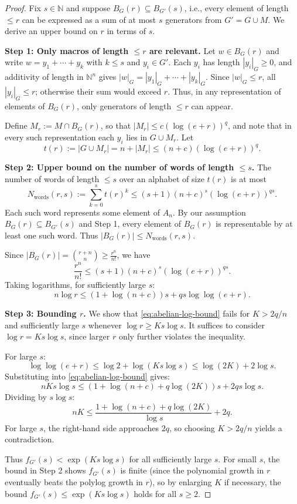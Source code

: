 \documentclass[12pt]{amsart}
\newcommand{\N}{\mathbb{N}}
\theoremstyle{definition}
\theoremstyle{remark}
\begin{document}
\begin{proof}
Fix $s \in \N$ and suppose $B_G(r) \subseteq B_{G'}(s)$, i.e., every element of length $\leq r$ can be expressed as a sum of at most $s$ generators from $G' = G \cup M$. We derive an upper bound on $r$ in terms of $s$.

\textbf{Step 1: Only macros of length $\leq r$ are relevant.}
Let $w \in B_G(r)$ and write $w = y_1 + \cdots + y_k$ with $k \leq s$ and $y_i \in G'$.
Each $y_i$ has length $|y_i|_G \geq 0$, and additivity of length in $\N^n$ gives $|w|_G = |y_1|_G + \cdots + |y_k|_G$.
Since $|w|_G \leq r$, all $|y_i|_G \leq r$; otherwise their sum would exceed $r$.
Thus, in any representation of elements of $B_G(r)$, only generators of length $\leq r$ can appear.

Define $M_r := M \cap B_G(r)$, so that $|M_r| \leq c(\log(e + r))^q$, and note that in every such representation each $y_i$ lies in $G \cup M_r$. Let
\[
t(r) := |G \cup M_r| = n + |M_r| \leq (n + c)(\log(e + r))^q.
\]

\textbf{Step 2: Upper bound on the number of words of length $\leq s$.}
The number of words of length $\leq s$ over an alphabet of size $t(r)$ is at most
\[
N_{\mathrm{words}}(r, s) := \sum_{k=0}^{s} t(r)^k \leq (s+1) (n+c)^s (\log(e + r))^{qs}.
\]
Each such word represents some element of $A_n$.
By our assumption $B_G(r) \subseteq B_{G'}(s)$ and Step 1, every element of $B_G(r)$ is representable by at least one such word.
Thus $|B_G(r)| \leq N_{\mathrm{words}}(r, s)$.

Since $|B_G(r)| = \binom{r+n}{n} \geq \frac{r^n}{n!}$, we have
\[
\frac{r^n}{n!} \leq (s+1) (n+c)^s (\log(e + r))^{qs}.
\]
Taking logarithms, for sufficiently large $s$:
\begin{equation}\label{eq:abelian-log-bound}
n \log r \leq (1 + \log(n+c)) s + qs \log\log(e + r).
\end{equation}

\textbf{Step 3: Bounding $r$.} We show that \eqref{eq:abelian-log-bound} fails for $K > 2q/n$ and sufficiently large $s$ whenever $\log r \geq Ks\log s$.
It suffices to consider $\log r = Ks\log s$, since larger $r$ only further violates the inequality.

For large $s$:
\[
\log\log(e + r) \leq \log 2 + \log(Ks \log s) \leq \log(2K) + 2 \log s.
\]
Substituting into \eqref{eq:abelian-log-bound} gives:
\[
nKs\log s \leq (1 + \log(n+c) + q\log(2K))s + 2qs\log s.
\]
Dividing by $s\log s$:
\[
nK \leq \frac{1 + \log(n+c) + q\log(2K)}{\log s} + 2q.
\]
For large $s$, the right-hand side approaches $2q$, so choosing $K > 2q/n$ yields a contradiction.

Thus $f_{G'}(s) < \exp(Ks\log s)$ for all sufficiently large $s$.
For small $s$, the bound in Step 2 shows $f_{G'}(s)$ is finite (since the polynomial growth in $r$ eventually beats the polylog growth in $r$), so by enlarging $K$ if necessary, the bound $f_{G'}(s) \leq \exp(Ks\log s)$ holds for all $s \geq 2$.
\end{proof}
\end{document}
